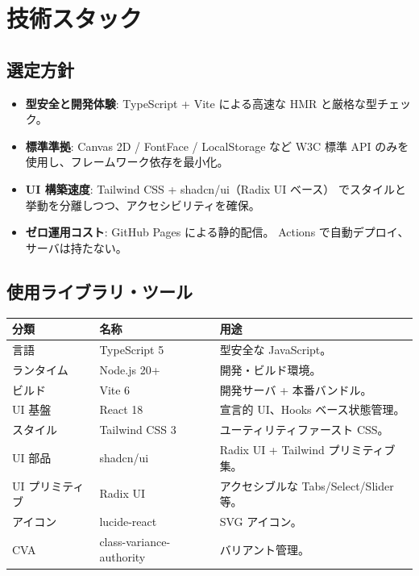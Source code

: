 \section{技術スタック}

\subsection{選定方針}

\begin{itemize}[leftmargin=*,itemsep=2pt]
  \item \textbf{型安全と開発体験}: TypeScript + Vite による高速な
        HMR と厳格な型チェック。
  \item \textbf{標準準拠}: Canvas 2D / FontFace / LocalStorage など
        W3C 標準 API のみを使用し、フレームワーク依存を最小化。
  \item \textbf{UI 構築速度}: Tailwind CSS + shadcn/ui（Radix UI ベース）
        でスタイルと挙動を分離しつつ、アクセシビリティを確保。
  \item \textbf{ゼロ運用コスト}: GitHub Pages による静的配信。
        Actions で自動デプロイ、サーバは持たない。
\end{itemize}

\subsection{使用ライブラリ・ツール}

\begin{tabularx}{\textwidth}{l l X}
\toprule
\textbf{分類} & \textbf{名称} & \textbf{用途} \\
\midrule
言語       & TypeScript 5     & 型安全な JavaScript。\\
ランタイム & Node.js 20+      & 開発・ビルド環境。\\
ビルド     & Vite 6           & 開発サーバ + 本番バンドル。\\
UI 基盤    & React 18         & 宣言的 UI、Hooks ベース状態管理。\\
スタイル   & Tailwind CSS 3   & ユーティリティファースト CSS。\\
UI 部品    & shadcn/ui        & Radix UI + Tailwind プリミティブ集。\\
UI プリミティブ & Radix UI    & アクセシブルな Tabs/Select/Slider 等。\\
アイコン   & lucide-react     & SVG アイコン。\\
CVA        & class-variance-authority & バリアント管理。\\
\bottomrule
\end{tabularx}

